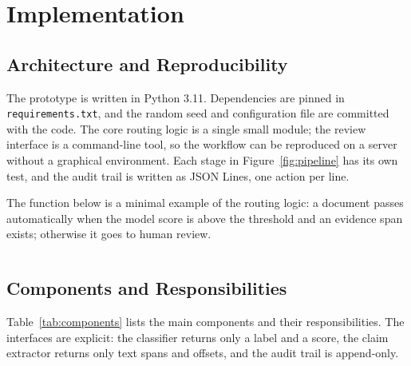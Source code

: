 \section{Implementation}
\label{sec:implementation}

\subsection{Architecture and Reproducibility}
\label{sec:architecture}

The prototype is written in Python 3.11. Dependencies are pinned in
\texttt{requirements.txt}, and the random seed and configuration file are committed with the
code. The core routing logic is a single small module; the review interface is a command-line
tool, so the workflow can be reproduced on a server without a graphical environment. Each
stage in Figure~\ref{fig:pipeline} has its own test, and the audit trail is written as JSON
Lines, one action per line.

The function below is a minimal example of the routing logic: a document passes automatically
when the model score is above the threshold and an evidence span exists; otherwise it goes to
human review.

\inputminted[fontsize=\footnotesize]{python}{code/example.py}

\subsection{Components and Responsibilities}
\label{sec:components}

Table~\ref{tab:components} lists the main components and their responsibilities. The
interfaces are explicit: the classifier returns only a label and a score, the claim extractor
returns only text spans and offsets, and the audit trail is append-only.


